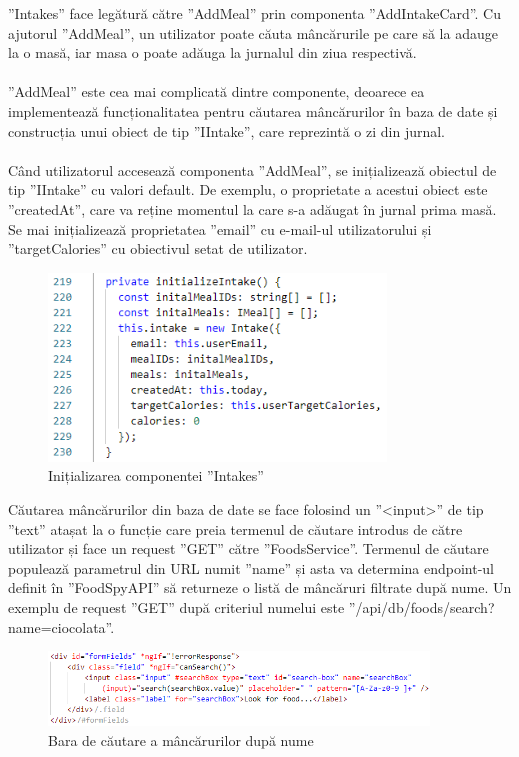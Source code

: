 ”Intakes” face legătură către ”AddMeal” prin componenta ”AddIntakeCard”. Cu ajutorul ”AddMeal”, un utilizator poate căuta mâncărurile pe care să la adauge la o masă, iar masa o poate adăuga la jurnalul din ziua respectivă.
\\ \\
”AddMeal” este cea mai complicată dintre componente, deoarece ea implementează funcționalitatea pentru căutarea mâncărurilor în baza de date și construcția unui obiect de tip ”IIntake”, care reprezintă o zi din jurnal.
\\ \\
Când utilizatorul accesează componenta ”AddMeal”, se inițializează obiectul de tip ”IIntake” cu valori default. De exemplu, o proprietate a acestui obiect este ”createdAt”, care va reține momentul la care s-a adăugat în jurnal prima masă. Se mai inițializează proprietatea ”email” cu e-mail-ul utilizatorului și ”targetCalories” cu obiectivul setat de utilizator.

\begin{figure}[!htb]
	\centering
	\includegraphics[width=0.8\textwidth]
	{../LaTeX/Images/implementare_initializeintake.PNG}
	\caption{Inițializarea componentei ”Intakes”}
	\label{fig:67}
\end{figure}

Căutarea mâncărurilor din baza de date se face folosind un ”<input>” de tip ”text” atașat la o funcție care preia termenul de căutare introdus de către utilizator și face un request ”GET” către ”FoodsService”. Termenul de căutare populează parametrul din URL numit ”name” și asta va determina endpoint-ul definit în ”FoodSpyAPI” să returneze o listă de mâncăruri filtrate după nume. Un exemplu de request ”GET” după criteriul numelui este ”/api/db/foods/search?name=ciocolata”.

\begin{figure}[!htb]
	\centering
	\includegraphics[width=0.9\textwidth]
	{../LaTeX/Images/implementare_search.PNG}
	\caption{Bara de căutare a mâncărurilor după nume}
	\label{fig:68}
\end{figure}

